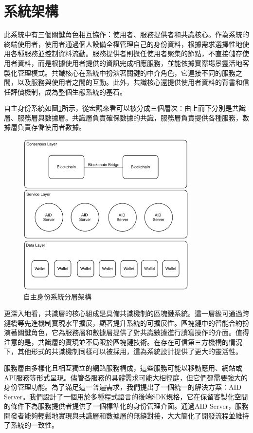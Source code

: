 \section{系統架構}
此系統中有三個關鍵角色相互協作：使用者、服務提供者和共識核心。作為系統的終端使用者，使用者通過個人設備全權管理自己的身份資料，根據需求選擇性地使用各種服務並控制資料流動。服務提供者則擔任使用者聚集的節點，不直接儲存使用者資料，而是根據使用者提供的資訊完成相應服務，並能依據實際場景靈活地客製化管理模式。共識核心在系統中扮演著關鍵的中介角色，它連接不同的服務之間，以及服務與使用者之間的互動。此外，共識核心還提供使用者資料的背書和信任評價機制，成為整個生態系統的基石。

自主身份系統如圖\ref{fig:aid-layers}所示，從宏觀來看可以被分成三個層次：由上而下分別是共識層、服務層與數據層。共識層負責確保數據的共識，服務層負責提供各種服務，數據層負責存儲使用者數據。
\begin{figure}
  \centering
  \includegraphics[width=0.8\textwidth]{figures/aidLayers.png}
  \caption{自主身份系統分層架構}
  \label{fig:aid-layers}
\end{figure}

更深入地看，共識層的核心組成是具備共識機制的區塊鏈系統。這一層級可通過跨鏈橋等先進機制實現水平擴展，顯著提升系統的可擴展性。區塊鏈中的智能合約扮演著關鍵角色，它為服務層和數據層提供了對共識數據進行讀寫操作的介面。值得注意的是，共識層的實現並不局限於區塊鏈技術。在存在可信第三方機構的情況下，其他形式的共識機制同樣可以被採用，這為系統設計提供了更大的靈活性。

服務層由多樣化且相互獨立的網路服務構成，這些服務可能以移動應用、網站或API服務等形式呈現。儘管各服務的具體需求可能大相徑庭，但它們都需要強大的身份管理功能。為了滿足這一普遍需求，我們提出了一個統一的解決方案：AID Server。我們設計了一個用於多種程式語言的後端SDK規格，它在保留客製化空間的條件下為服務提供者提供了一個標準化的身份管理介面。通過AID Server，服務開發者能夠輕鬆地實現與共識層和數據層的無縫對接，大大簡化了開發流程並維持了系統的一致性。

